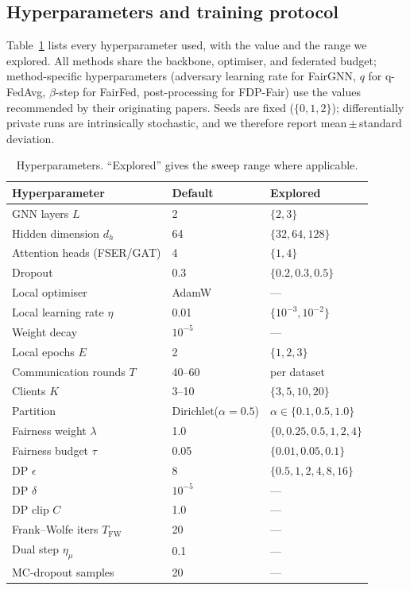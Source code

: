 \documentclass[pdflatex,sn-mathphys-num]{sn-jnl}
\theoremstyle{thmstyleone}%
\theoremstyle{thmstyletwo}%
\theoremstyle{thmstylethree}%
\begin{document}
\begin{appendices}

\section{Hyperparameters and training protocol}
\label{app:hyper}
Table~\ref{tab:hyper} lists every hyperparameter used, with the value and the
range we explored. All methods share the backbone, optimiser, and federated
budget; method-specific hyperparameters (adversary learning rate for FairGNN,
$q$ for q-FedAvg, $\beta$-step for FairFed, post-processing for FDP-Fair) use the
values recommended by their originating papers. Seeds are fixed
($\{0,1,2\}$); differentially private runs are intrinsically stochastic, and we
therefore report mean\,$\pm$\,standard deviation.

\begin{table}[h]
\centering\small
\caption{Hyperparameters. ``Explored'' gives the sweep range where applicable.}
\label{tab:hyper}
\begin{tabular}{lll}
\toprule
Hyperparameter & Default & Explored \\
\midrule
GNN layers $L$ & 2 & $\{2,3\}$ \\
Hidden dimension $d_h$ & 64 & $\{32,64,128\}$ \\
Attention heads (FSER/GAT) & 4 & $\{1,4\}$ \\
Dropout & 0.3 & $\{0.2,0.3,0.5\}$ \\
Local optimiser & AdamW & --- \\
Local learning rate $\eta$ & 0.01 & $\{10^{-3},10^{-2}\}$ \\
Weight decay & $10^{-5}$ & --- \\
Local epochs $E$ & 2 & $\{1,2,3\}$ \\
Communication rounds $T$ & 40--60 & per dataset \\
Clients $K$ & 3--10 & $\{3,5,10,20\}$ \\
Partition & Dirichlet($\alpha{=}0.5$) & $\alpha\in\{0.1,0.5,1.0\}$ \\
Fairness weight $\lambda$ & 1.0 & $\{0,0.25,0.5,1,2,4\}$ \\
Fairness budget $\tau$ & 0.05 & $\{0.01,0.05,0.1\}$ \\
DP $\epsilon$ & 8 & $\{0.5,1,2,4,8,16\}$ \\
DP $\delta$ & $10^{-5}$ & --- \\
DP clip $C$ & 1.0 & --- \\
Frank--Wolfe iters $T_{\mathrm{FW}}$ & 20 & --- \\
Dual step $\eta_\mu$ & 0.1 & --- \\
MC-dropout samples & 20 & --- \\
\bottomrule
\end{tabular}
\end{table}


\end{appendices}
\end{document}
